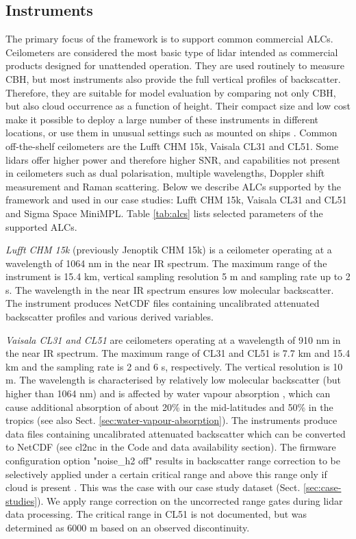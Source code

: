 \subsection{Instruments}
\label{sec:alcs}

The primary focus of the framework is to support common commercial ALCs.
Ceilometers are considered the most basic type of lidar \citep{emeis2010,kotthaus2016}
intended as commercial products designed for unattended operation.
They are used routinely to measure CBH, but most instruments also provide the
full vertical profiles of backscatter. Therefore, they are suitable for model
evaluation by comparing not only CBH, but also cloud occurrence as a function
of height. Their compact size and low cost make it possible to deploy a large
number of these instruments in different locations, or use them in unusual settings
such as mounted on ships \citep{klekociuk2019,kuma2020a}. Common off-the-shelf
ceilometers are
the Lufft CHM 15k, Vaisala CL31 and CL51.
Some lidars offer higher power
and therefore higher SNR, and capabilities not present in ceilometers such as
dual polarisation, multiple wavelengths, Doppler shift measurement and Raman scattering.
Below we describe ALCs supported by the framework and used in our case studies:
Lufft CHM 15k, Vaisala CL31 and CL51 and Sigma Space MiniMPL.
Table \ref{tab:alcs} lists selected parameters of the supported ALCs.

\textit{Lufft CHM 15k} (previously Jenoptik CHM 15k) is a ceilometer operating
at a wavelength of 1064 nm in the
near IR spectrum. The maximum range of the instrument is 15.4 km, vertical sampling
resolution 5 m and sampling rate up to 2 s. The wavelength in the near IR
spectrum ensures low molecular backscatter.
The instrument produces NetCDF files containing uncalibrated attenuated
backscatter profiles and various derived variables.

\textit{Vaisala CL31 and CL51} are ceilometers operating at a wavelength of 910
nm in the near IR spectrum. The maximum range of CL31 and CL51 is 7.7 km and 15.4 km
and the sampling rate is 2 and 6 s, respectively. The vertical resolution
is 10 m. The wavelength is characterised by relatively low molecular backscatter
(but higher than 1064 nm) and is affected by water vapour absorption
\citep{wiegner2015,wiegner2019}, which can cause additional absorption of about 
20\% in the mid-latitudes and 50\% in the tropics (see also Sect. \ref{sec:water-vapour-absorption}).
The instruments produce
data files containing uncalibrated attenuated backscatter which can be converted
to NetCDF (see cl2nc in the Code and data availability section).
The firmware configuration option "noise\_h2 off" results in backscatter
range correction to be selectively applied under a certain critical range
and above this range only if cloud is present \citep[Sect. 3.2]{kotthaus2016}.
This was the case with our case study dataset (Sect. \ref{sec:case-studies}).
We apply range correction on the uncorrected range gates during lidar
data processing. The critical range in CL51 is not documented, but was
determined as 6000 m based on an observed discontinuity.

